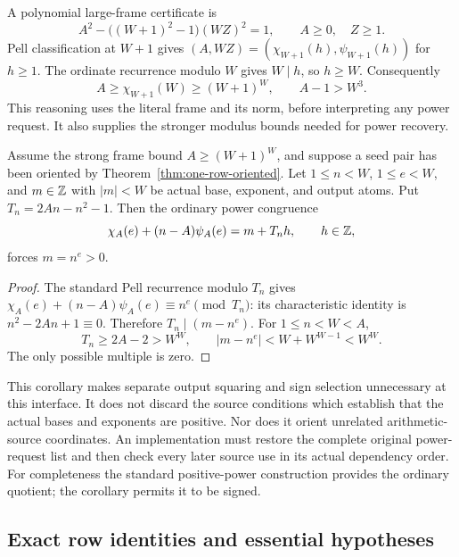 A polynomial large-frame certificate is
\[
 A^2-\bigl((W+1)^2-1\bigr)(WZ)^2=1,
 \qquad A\ge0,\quad Z\ge1.
\]
Pell classification at $W+1$ gives
$(A,WZ)=(\chi_{W+1}(h),\psi_{W+1}(h))$ for $h\ge1$.
The ordinate recurrence modulo $W$ gives $W\mid h$, so $h\ge W$.
Consequently
\[
 A\ge\chi_{W+1}(W)\ge(W+1)^W,
 \qquad A-1>W^3.
\]
This reasoning uses the literal frame and its norm, before interpreting
any power request.  It also supplies the stronger modulus bounds needed
for power recovery.

\begin{corollary}
\label{cor:one-row-signed-power}
Assume the strong frame bound $A\ge(W+1)^W$, and suppose a seed pair
has been oriented by Theorem~\ref{thm:one-row-oriented}.  Let
$1\le n<W$, $1\le e<W$, and $m\in\mathbb Z$ with $|m|<W$ be actual
base, exponent, and output atoms.  Put $T_n=2An-n^2-1$.  Then the
ordinary power congruence
\[
 \chi_A(e)+(n-A)\psi_A(e)=m+T_n h,\qquad h\in\mathbb Z,
\]
forces $m=n^e>0$.
\end{corollary}
\begin{proof}
The standard Pell recurrence modulo $T_n$ gives
$\chi_A(e)+(n-A)\psi_A(e)\equiv n^e\pmod{T_n}$: its characteristic
identity is $n^2-2An+1\equiv0$.  Therefore $T_n\mid(m-n^e)$.
For $1\le n<W<A$,
\[
 T_n\ge2A-2>W^W,
 \qquad |m-n^e|<W+W^{W-1}<W^W.
\]
The only possible multiple is zero.
\end{proof}

This corollary makes separate output squaring and sign selection
unnecessary at this interface.  It does not discard the source
conditions which establish that the actual bases and exponents are
positive.  Nor does it orient unrelated arithmetic-source coordinates.
An implementation must restore the complete original power-request
list and then check every later source use in its actual dependency
order.  For completeness the standard positive-power construction
provides the ordinary quotient; the corollary permits it to be signed.

\subsection{Exact row identities and essential hypotheses}

